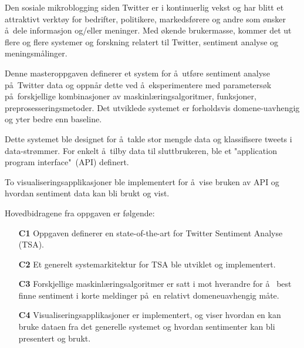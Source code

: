 Den sosiale mikroblogging siden Twitter er i kontinuerlig vekst og har blitt et attraktivt verkt\o y for bedrifter, politikere, markedsf\o rere og andre som \o nsker \aa~dele informasjon og/eller meninger. Med \o kende brukermasse, kommer det ut flere og flere systemer og forskning relatert til Twitter, sentiment analyse og meningsmålinger.

Denne masteroppgaven definerer et system for \aa~utf\o re sentiment analyse p\aa~Twitter data og oppn\aa r dette ved \aa~eksperimentere med parameters\o k p\aa~forskjellige kombinasjoner av maskinl\ae ringsalgoritmer, funksjoner, preprosesseringsmetoder. Det utviklede systemet er forholdsvis domene-uavhengig og yter bedre enn baseline.

Dette systemet ble designet for \aa~takle stor mengde data og klassifisere tweets i data-str\o mmer. For enkelt \aa~tilby data til sluttbrukeren, ble et "application program interface"~(API) definert.

To visualiseringsapplikasjoner ble implementert for \aa~vise bruken av API og hvordan sentiment data kan bli brukt og vist.

Hovedbidragene fra oppgaven er f\o lgende:

\begin{itemize}
\item[\textbf{C1}] Oppgaven definerer en state-of-the-art for Twitter Sentiment Analyse (TSA).

\item[\textbf{C2}] Et generelt systemarkitektur for TSA ble utviklet og implementert.

\item[\textbf{C3}] Forskjellige maskinl\ae ringsalgoritmer er satt i mot hverandre for \aa~ best finne sentiment i korte meldinger p\aa~en relativt domeneuavhengig måte.

\item[\textbf{C4}] Visualiseringsapplikasjoner er implementert, og viser hvordan en kan bruke dataen fra det generelle systemet og hvordan sentimenter kan bli presentert og brukt.
\end{itemize}

\clearpage